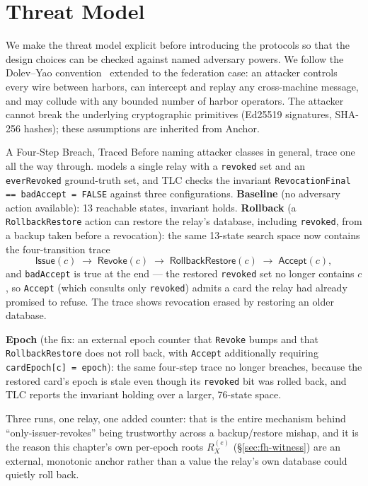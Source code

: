 \documentclass[11pt,a4paper]{article}
\theoremstyle{definition}
\theoremstyle{remark}
\begin{document}
\section{Threat Model}\label{sec:fh-threat-model}
We make the threat model explicit before introducing the protocols so that the design choices can be checked against named adversary powers. We follow the Dolev--Yao convention~ extended to the federation case: an attacker controls every wire between harbors, can intercept and replay any cross-machine message, and may collude with any bounded number of harbor operators. The attacker cannot break the underlying cryptographic primitives (Ed25519 signatures, SHA-256 hashes); these assumptions are inherited from Anchor.
\begin{pdexample}{A Four-Step Breach, Traced}
\setlength{\parskip}{4pt plus 1pt}
Before naming attacker classes in general, trace one all the way through.  models a single relay with a \texttt{revoked} set and an \texttt{everRevoked} ground-truth set, and TLC checks the invariant \texttt{RevocationFinal == badAccept = FALSE} against three configurations.
\textbf{Baseline} (no adversary action available): 13 reachable states, invariant holds.
\textbf{Rollback} (a \texttt{RollbackRestore} action can restore the relay's database, including \texttt{revoked}, from a backup taken before a revocation): the same 13-state search space now contains the four-transition trace
\[
\mathsf{Issue}(c) \;\to\; \mathsf{Revoke}(c) \;\to\; \mathsf{RollbackRestore}(c) \;\to\; \mathsf{Accept}(c),
\]
and \texttt{badAccept} is true at the end --- the restored \texttt{revoked} set no longer contains $c$, so \texttt{Accept} (which consults only \texttt{revoked}) admits a card the relay had already promised to refuse. The trace shows revocation erased by restoring an older database.

\textbf{Epoch} (the fix: an external epoch counter that \texttt{Revoke} bumps and that \texttt{RollbackRestore} does not roll back, with \texttt{Accept} additionally requiring \texttt{cardEpoch[c] = epoch}): the same four-step trace no longer breaches, because the restored card's epoch is stale even though its \texttt{revoked} bit was rolled back, and TLC reports the invariant holding over a larger, 76-state space.

Three runs, one relay, one added counter: that is the entire mechanism behind ``only-issuer-revokes'' being trustworthy across a backup/restore mishap, and it is the reason this chapter's own per-epoch roots $R_X^{(e)}$ (\S\ref{sec:fh-witness}) are an external, \mbox{monotonic} anchor rather than a value the relay's own database could quietly roll back.
\end{pdexample}
\end{document}
